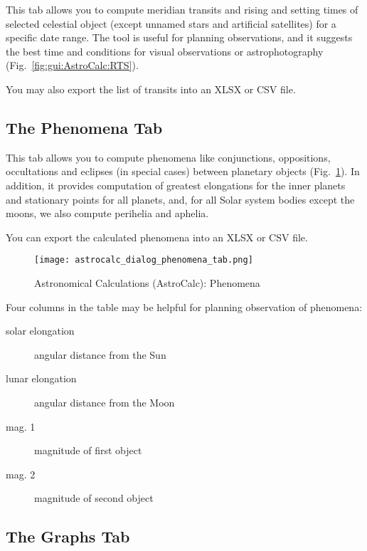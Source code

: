 \noindent This  tab allows you to compute meridian transits and
 rising and setting times of selected celestial object 
(except unnamed stars and artificial satellites) for a specific date range. 
The tool is useful for planning observations, and it suggests the best time and conditions 
for visual observations or astrophotography (Fig.~\ref{fig:gui:AstroCalc:RTS}). 

You may also export the list of transits into an XLSX or CSV file.

\subsection{The Phenomena Tab}
\label{sec:gui:AstroCalc:Phenomena}

This tab allows you to compute phenomena like conjunctions, oppositions, 
occultations and eclipses (in special cases) between planetary objects 
(Fig.~\ref{fig:gui:AstroCalc:Phenomena}). 
In addition,  it provides computation of greatest 
elongations for the inner planets and stationary points for all planets, and,
for all Solar system bodies except the moons, we also compute perihelia and aphelia.

You can export the calculated phenomena into an XLSX or CSV file.

\begin{figure}[tbp]
\centering\texttt{[image: astrocalc\_dialog\_phenomena\_tab.png]}
\caption{Astronomical Calculations (AstroCalc): Phenomena}
\label{fig:gui:AstroCalc:Phenomena}
\end{figure}

Four columns in the table may be helpful for planning observation of phenomena:
\begin{description}
  \item[solar elongation] angular distance from the Sun
  \item[lunar elongation] angular distance from the Moon
  \item[mag. 1] magnitude of first object
  \item[mag. 2] magnitude of second object
\end{description}


\subsection{The Graphs Tab}
\label{sec:gui:AstroCalc:Graphs}


